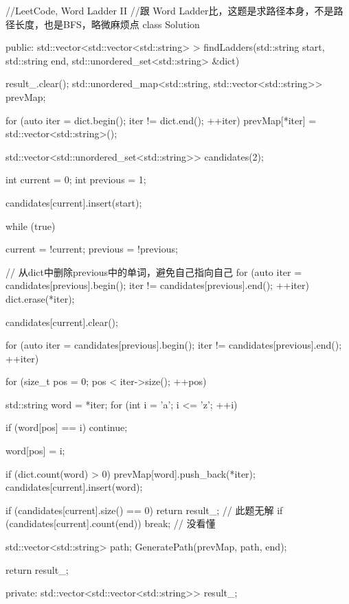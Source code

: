 \begin{Code}
//LeetCode, Word Ladder II
//跟 Word Ladder比，这题是求路径本身，不是路径长度，也是BFS，略微麻烦点
class Solution {
public:
    std::vector<std::vector<std::string> > findLadders(std::string start,
            std::string end, std::unordered_set<std::string> &dict) {
        result_.clear();
        std::unordered_map<std::string, std::vector<std::string>> prevMap;

        for (auto iter = dict.begin(); iter != dict.end(); ++iter) {
            prevMap[*iter] = std::vector<std::string>();
        }

        std::vector<std::unordered_set<std::string>> candidates(2);

        int current = 0;
        int previous = 1;

        candidates[current].insert(start);

        while (true) {
            current = !current;
            previous = !previous;

            // 从dict中删除previous中的单词，避免自己指向自己
            for (auto iter = candidates[previous].begin();
                    iter != candidates[previous].end(); ++iter) {
                dict.erase(*iter);
            }

            candidates[current].clear();

            for (auto iter = candidates[previous].begin();
                    iter != candidates[previous].end(); ++iter) {
                for (size_t pos = 0; pos < iter->size(); ++pos) {
                    std::string word = *iter;
                    for (int i = 'a'; i <= 'z'; ++i) {
                        if (word[pos] == i) continue;

                        word[pos] = i;

                        if (dict.count(word) > 0) {
                            prevMap[word].push_back(*iter);
                            candidates[current].insert(word);
                        }
                    }
                }
            }

            if (candidates[current].size() == 0) return result_;  // 此题无解
            if (candidates[current].count(end)) break; // 没看懂
        }

        std::vector<std::string> path;
        GeneratePath(prevMap, path, end);

        return result_;
    }

private:
    std::vector<std::vector<std::string>> result_;

}
\end{Code}
